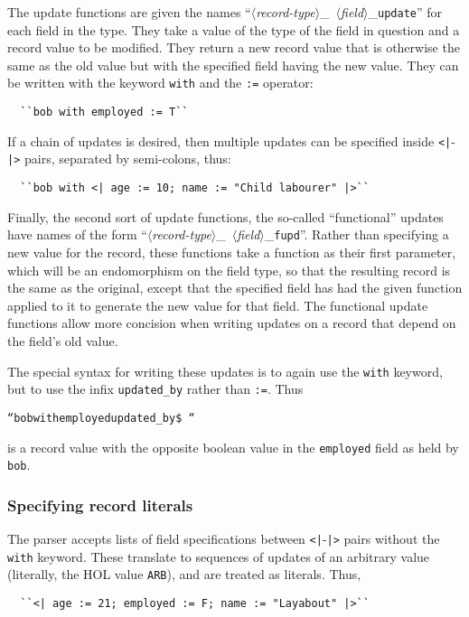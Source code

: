 \documentclass[12pt,fleqn,a4paper]{report}
\begin{document}
The update functions are given the names
\mbox{``$\langle$\textsl{record-type\/}$\rangle$\_%
$\langle$\textsl{field\/}$\rangle$\_\texttt{update}''} for each
field in the type.  They take a value of the type of the field in
question and a record value to be modified.  They return a new record
value that is otherwise the same as the old value but with the
specified field having the new value.  They can be written with the
keyword \texttt{with} and the \texttt{:=} operator:
\begin{verbatim}
  ``bob with employed := T``
\end{verbatim}
\noindent If a chain of updates is desired, then multiple updates can
be specified inside \texttt{<|}-\texttt{|>} pairs, separated by
semi-colons, thus:

\begin{verbatim}
  ``bob with <| age := 10; name := "Child labourer" |>``
\end{verbatim}

\noindent Finally, the second sort of update functions, the so-called
``functional'' updates have names of the form
\mbox{``$\langle$\textsl{record-type\/}$\rangle$\_%
$\langle$\textsl{field\/}$\rangle$\_\texttt{fupd}''}. Rather than
specifying a new value for the record, these functions take a function
as their first parameter, which will be an endomorphism on the field
type, so that the resulting record is the same as the original, except
that the specified field has had the given function applied to it to
generate the new value for that field.  The functional update
functions allow more concision when writing updates on a record that
depend on the field's old value.

The special syntax for writing these updates is to again use the
\texttt{with} keyword, but to use the infix \texttt{updated\_by}
rather than \texttt{:=}.  Thus
\begin{alltt}
  ``bob with employed updated_by \$~``
\end{alltt} \noindent
is a record value with the opposite boolean value in the
\texttt{employed} field as held by \texttt{bob}.

\subsubsection{Specifying record literals}

The parser accepts lists of field specifications between
\texttt{<|}-\texttt{|>} pairs without the \texttt{with} keyword.
These translate to sequences of updates of an arbitrary value
(literally, the HOL value \texttt{ARB}), and are treated as literals.
Thus,
\begin{verbatim}
  ``<| age := 21; employed := F; name := "Layabout" |>``
\end{verbatim}
\end{document}

